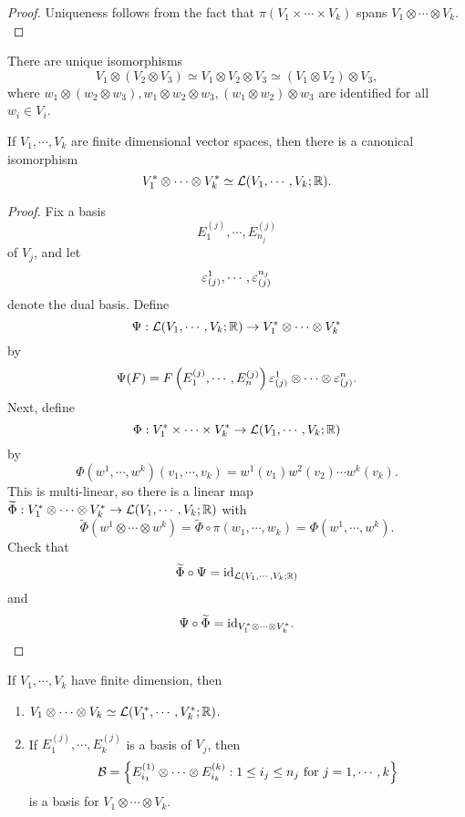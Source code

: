 \begin{proof}
    Uniqueness follows from the fact that $\pi(V_1 \times \cdots \times V_k)$ spans $V_1 \otimes \cdots \otimes V_k. $
\end{proof}
\begin{proposition}\label{12.9}
    There are unique isomorphisms
    $$V_1 \otimes (V_2 \otimes V_3) \simeq V_1 \otimes V_2 \otimes V_3 \simeq (V_1 \otimes V_2) \otimes V_3, $$ where $w_1 \otimes (w_2 \otimes w_3), w_1 \otimes w_2 \otimes w_3, (w_1 \otimes w_2) \otimes w_3$ are identified for all $w_i \in V_i$. 
\end{proposition}
\begin{proposition}\label{12.10}
    If $V_1, \cdots, V_k$ are finite dimensional vector spaces, then there is a canonical isomorphism 
    $$V_1^* \otimes \cdots \otimes V_k^* \simeq \mathcal{L}(V_1, \cdots, V_k; \mathbb{R}). $$
\end{proposition}
\begin{proof}
    Fix a basis 
    $$E_1^{(j)}, \cdots, E_{n_j}^{(j)} $$ of $V_j$,  and let 
    $$\varepsilon_{(j)}^1, \cdots, \varepsilon_{(j)}^{n_j}$$ denote the dual basis. Define 
    $$\Psi:\mathcal{L}(V_1, \cdots, V_k; \mathbb{R}) \to V_1^* \otimes \cdots \otimes V_k^* $$ by 
    $$ \Psi(F) = F\left(E_1^{(j)}, \cdots, E_n^{(j)}\right)\varepsilon_{(j)}^1 \otimes \cdots \otimes \varepsilon_{(j)}^n. $$ Next, define $$\Phi: V_1^* \times \cdots \times V_k^* \to \mathcal{L}(V_1, \cdots, V_k; \mathbb{R})$$ by $$\Phi(w^1, \cdots, w^k)(v_1, \cdots, v_k) = w^1(v_1)w^2(v_2)\cdots w^k(v_k). $$ This is multi-linear, so there is a linear map $\widetilde{\Phi}:V_1^* \otimes \cdots \otimes V_k^* \to \mathcal{L}(V_1, \cdots, V_k; \mathbb{R})$ with 
    $$\widetilde{\Phi}(w^1 \otimes \cdots \otimes w^k)  
      = \widetilde{\Phi} \circ \pi (w_1, \cdots, w_k) 
      = \Phi(w^1, \cdots, w^k). $$ 
    Check that 
    $$\widetilde{\Phi} \circ \Psi = \mathrm{id}_{\mathcal{L}(V_1,\cdots,V_k;\mathbb{R})}$$ and 
    $$\Psi \circ \widetilde{\Phi} = \mathrm{id}_{V_1^* \otimes \cdots \otimes V_k^*}. $$
\end{proof}
\begin{corollary}\label{12.8}
    If $V_1, \cdots, V_k$ have finite dimension, then 
    \begin{enumerate}
    \item $V_1 \otimes \cdots \otimes V_k \simeq \mathcal{L}(V_1^*,\cdots,V_k^*;\mathbb{R})$.
    \item If $E_1^{(j)}, \cdots, E_k^{(j)}$ is a basis of $V_j$, then 
    $$\mathcal{B} = \left\{
    E_{i_1}^{(1)} \otimes \cdots \otimes E_{i_k}^{(k)}:
    1 \leq i_j \leq n_j \text{ for }j=1,\cdots,k
    \right\}$$ is a basis for $V_1 \otimes \cdots \otimes V_k$. 
    \end{enumerate}
\end{corollary}

